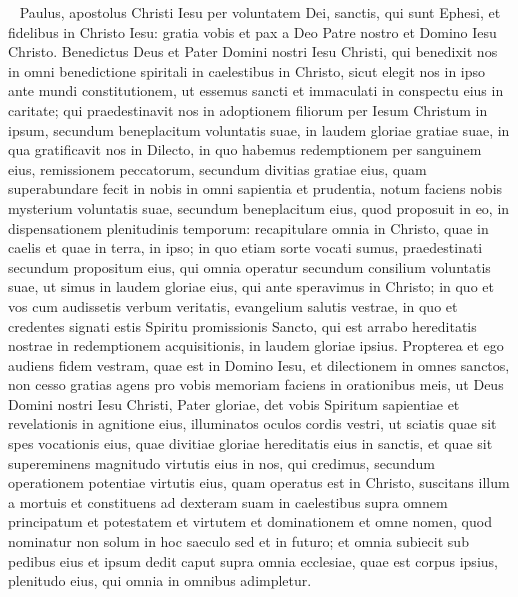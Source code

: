 
\begin{biblechapter}   
\verse Paulus, apostolus Christi Iesu per voluntatem Dei, sanctis, qui sunt Ephesi, et fidelibus in Christo Iesu: 
\verse gratia vobis et pax a Deo Patre nostro et Domino Iesu Christo. 
\verse Benedictus Deus et Pater Domini nostri Iesu Christi, qui benedixit nos in omni benedictione spiritali in caelestibus in Christo, 
\verse sicut elegit nos in ipso ante mundi constitutionem, ut essemus sancti et immaculati in conspectu eius in caritate; 
\verse qui praedestinavit nos in adoptionem filiorum per Iesum Christum in ipsum, secundum beneplacitum voluntatis suae, 
\verse in laudem gloriae gratiae suae, in qua gratificavit nos in Dilecto, 
\verse in quo habemus redemptionem per sanguinem eius, remissionem peccatorum, secundum divitias gratiae eius, 
\verse quam superabundare fecit in nobis in omni sapientia et prudentia, 
\verse notum faciens nobis mysterium voluntatis suae, secundum beneplacitum eius, quod proposuit in eo, 
\verse in dispensationem plenitudinis temporum: recapitulare omnia in Christo, quae in caelis et quae in terra, in ipso; 
\verse in quo etiam sorte vocati sumus, praedestinati secundum propositum eius, qui omnia operatur secundum consilium voluntatis suae, 
\verse ut simus in laudem gloriae eius, qui ante speravimus in Christo; 
\verse in quo et vos cum audissetis verbum veritatis, evangelium salutis vestrae, in quo et credentes signati estis Spiritu promissionis Sancto, 
\verse qui est arrabo hereditatis nostrae in redemptionem acquisitionis, in laudem gloriae ipsius. 
\verse Propterea et ego audiens fidem vestram, quae est in Domino Iesu, et dilectionem in omnes sanctos, 
\verse non cesso gratias agens pro vobis memoriam faciens in orationibus meis, 
\verse ut Deus Domini nostri Iesu Christi, Pater gloriae, det vobis Spiritum sapientiae et revelationis in agnitione eius, 
\verse illuminatos oculos cordis vestri, ut sciatis quae sit spes vocationis eius, quae divitiae gloriae hereditatis eius in sanctis, 
\verse et quae sit supereminens magnitudo virtutis eius in nos, qui credimus, secundum operationem potentiae virtutis eius, 
\verse quam operatus est in Christo, suscitans illum a mortuis et constituens ad dexteram suam in caelestibus 
\verse supra omnem principatum et potestatem et virtutem et dominationem et omne nomen, quod nominatur non solum in hoc saeculo sed et in futuro; 
\verse et omnia subiecit sub pedibus eius et ipsum dedit caput supra omnia ecclesiae, 
\verse quae est corpus ipsius, plenitudo eius, qui omnia in omnibus adimpletur. 
\end{biblechapter}


